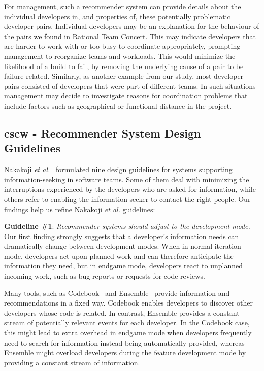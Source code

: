 For management, such a recommender system can provide details about the
individual developers in, and properties of, these potentially problematic
developer pairs. Individual developers may be an explanation for the behaviour of
the pairs we found in Rational Team Concert. This may indicate developers that are
harder to work with or too busy to coordinate appropriately, prompting management
to reorganize teams and workloads. This would minimize the likelihood of a build
to fail, by removing the underlying cause of a pair to be failure related.
Similarly, as another example from our study, most developer pairs
consisted of developers that were part of different teams. In such
situations management may decide to investigate reasons for coordination
problems that include factors such as geographical or functional distance in the project.

\subsection{cscw - Recommender System Design Guidelines}
\label{sec:sub:tools}
Nakakoji \emph{et al.}~\cite{nakakoji2010:rdc} formulated nine design guidelines for systems supporting information-seeking in software teams. Some of them deal with minimizing the interruptions experienced by the developers who are asked for information, while others refer to enabling the information-seeker to contact the right people. Our findings help us refine Nakakoji \emph{et al.} guidelines:


\textbf{Guideline \#1}: \emph{Recommender systems should adjust to the development mode.}
Our first finding strongly suggests that a developer's information needs can dramatically change between development modes. 
%
When in normal iteration mode, developers act upon planned work and can therefore anticipate the information they need, but in endgame mode, developers react to unplanned incoming work, such as bug reports or requests for code reviews. 

Many tools, such as Codebook~\cite{begel:icse:2010} and Ensemble~\cite{xiang:rsse:2008} provide information and recommendations in a fixed way. 
Codebook enables developers to discover other developers whose code is related.
In contrast,  Ensemble provides a constant stream of potentially relevant events for each developer.
In the Codebook case, this might lead to extra overhead in endgame mode when developers frequently need to search for information instead being automatically provided, whereas Ensemble might overload developers during the feature development mode by providing a constant stream of information.

